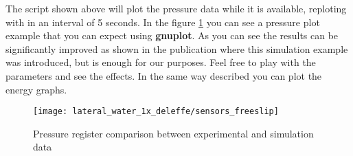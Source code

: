 %
The script shown above will plot the pressure data while it is available, reploting with in an interval of 5
seconds. In the figure \ref{fig:examples:lateral_water_1x_deleffe:sensors} you can see a pressure plot example
that you can expect using \textbf{gnuplot}.\rc
%
As you can see the results can be significantly improved as shown in the publication \citep{Maciaetal_PTP_2012}
where this simulation example was introduced, but is enough for our purposes. Feel free to play with the
parameters and see the effects.\rc
%
In the same way described you can plot the energy graphs.
%
\begin{figure}[h!]
  \centering
  \texttt{[image: lateral\_water\_1x\_deleffe/sensors\_freeslip]}
  \caption{Pressure register comparison between experimental and simulation data}
  \label{fig:examples:lateral_water_1x_deleffe:sensors}
\end{figure}
%
